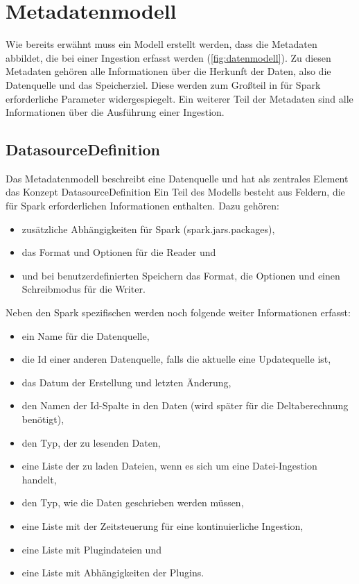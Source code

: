 \section{Metadatenmodell}

Wie bereits erwähnt muss ein Modell erstellt werden, dass die Metadaten abbildet, die bei einer Ingestion erfasst werden (\cref{fig:datenmodell}).
Zu diesen Metadaten gehören alle Informationen über die Herkunft der Daten, also die Datenquelle und das Speicherziel.
Diese werden zum Großteil in für Spark erforderliche Parameter widergespiegelt.
Ein weiterer Teil der Metadaten sind alle Informationen über die Ausführung einer Ingestion.

\subsection{DatasourceDefinition}

Das Metadatenmodell beschreibt eine Datenquelle und hat als zentrales Element das Konzept DatasourceDefinition
Ein Teil des Modells besteht aus Feldern, die für Spark erforderlichen Informationen enthalten.
Dazu gehören: \begin{itemize}
    \item zusätzliche Abhängigkeiten für Spark (spark.jars.packages),
    \item das Format und Optionen für die Reader und
    \item und bei benutzerdefinierten Speichern das Format, die Optionen und einen Schreibmodus für die Writer.
\end{itemize}
Neben den Spark spezifischen werden noch folgende weiter Informationen erfasst: \begin{itemize}
    \item ein Name für die Datenquelle,
    \item die Id einer anderen Datenquelle, falls die aktuelle eine Updatequelle ist,
    \item das Datum der Erstellung und letzten Änderung,
    \item den Namen der Id-Spalte in den Daten (wird später für die Deltaberechnung benötigt),
    \item den Typ, der zu lesenden Daten,
    \item eine Liste der zu laden Dateien, wenn es sich um eine Datei-Ingestion handelt,
    \item den Typ, wie die Daten geschrieben werden müssen,
    \item eine Liste mit der Zeitsteuerung für eine kontinuierliche Ingestion,
    \item eine Liste mit Plugindateien und
    \item eine Liste mit Abhängigkeiten der Plugins.
\end{itemize}

